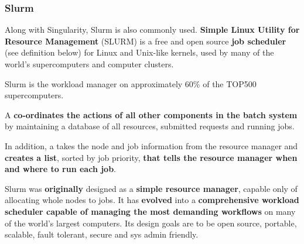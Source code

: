 \longline

\subsubsection{Slurm}

Along with Singularity, Slurm is also commonly used. \textbf{Simple Linux Utility for Resource Management} (SLURM) is a free and open source \textbf{job scheduler} (see definition below) for Linux and Unix-like kernels, used by many of the world's supercomputers and computer clusters.

\highspace
Slurm is the workload manager on approximately 60\% of the TOP500 supercomputers.

\highspace
A  \textbf{co-ordinates the actions of all other components in the batch system} by maintaining a database of all resources, submitted requests and running jobs.

\highspace
In addition, a  takes the node and job information from the resource manager and \textbf{creates a list}, sorted by job priority, \textbf{that tells the resource manager when and where to run each job}.

\highspace
Slurm was \textbf{originally} designed as a \textbf{simple resource manager}, capable only of allocating whole nodes to jobs. It has \textbf{evolved} into a \textbf{comprehensive workload scheduler capable of managing the most demanding workflows} on many of the world's largest computers. Its design goals are to be open source, portable, scalable, fault tolerant, secure and sys admin friendly.

\newpage

